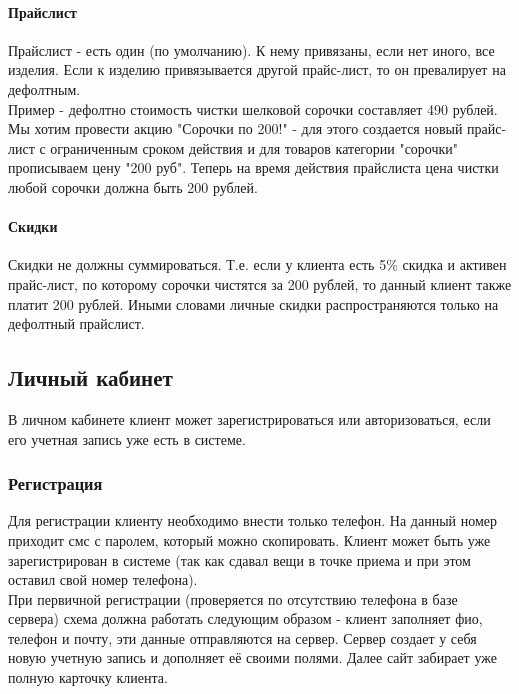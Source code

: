 \documentclass[DIV=calc, paper=a4, fontsize=11pt]{scrartcl} %
\begin{document}
\paragraph{Прайслист}
Прайслист - есть один (по умолчанию). К нему привязаны, если нет иного, все изделия. Если к изделию привязывается другой прайс-лист, то он превалирует на дефолтным. 
\\[0.5cm]
Пример - дефолтно стоимость чистки шелковой сорочки составляет 490 рублей. Мы хотим провести акцию "Сорочки по 200!" - для этого создается новый прайс-лист с ограниченным сроком действия и для товаров категории "сорочки" прописываем цену "200 руб". Теперь на время действия прайслиста цена чистки любой сорочки должна быть 200 рублей.

\paragraph{Скидки}
Скидки не должны суммироваться. Т.е. если у клиента есть 5\% скидка и активен прайс-лист, по которому сорочки чистятся за 200 рублей, то данный клиент также платит 200 рублей. Иными словами личные скидки распространяются только на дефолтный прайслист.


\subsection{Личный кабинет}
В личном кабинете клиент может зарегистрироваться или авторизоваться, если его учетная запись уже есть в системе.

\subsubsection{Регистрация}
Для регистрации клиенту необходимо внести только телефон. На данный номер приходит смс с паролем, который можно скопировать. Клиент может быть уже зарегистрирован в системе (так как сдавал вещи в точке приема и при этом оставил свой номер телефона).
\\[0.5cm]
При первичной регистрации (проверяется по отсутствию телефона в базе сервера) схема должна работать следующим образом - клиент заполняет фио, телефон и почту, эти данные отправляются на сервер. Сервер создает у себя новую учетную запись и дополняет её своими полями. Далее сайт забирает уже полную карточку клиента.
\end{document}

